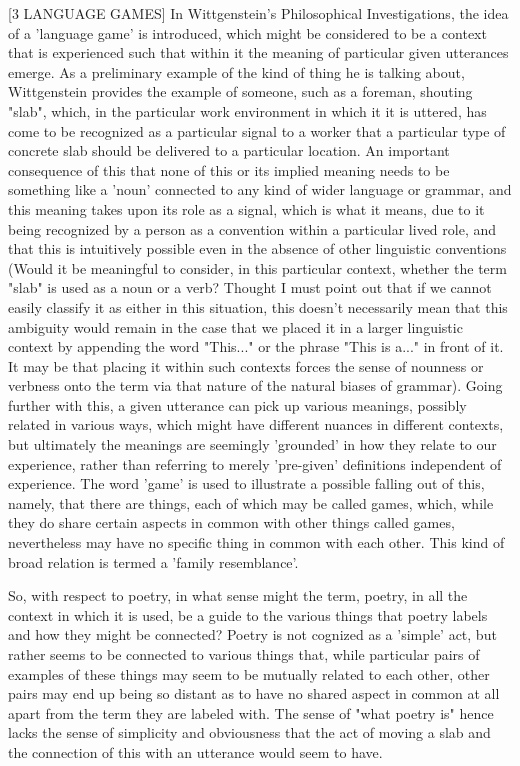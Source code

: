 \documentclass[]{article}
\begin{document}
[3 LANGUAGE GAMES] In Wittgenstein's Philosophical Investigations, the idea of a 'language game' is introduced, which might be considered to be a context that is experienced such that within it the meaning of particular given utterances emerge. As a preliminary example of the kind of thing he is talking about, Wittgenstein provides the example of someone, such as a foreman, shouting "slab", which, in the particular work environment in which it it is uttered, has come to be recognized as a particular signal to a worker that a particular type of concrete slab should be delivered to a particular location. An important consequence of this that none of this or its implied meaning needs to be something like a 'noun' connected to any kind of wider language or grammar, and this meaning takes upon its role as a signal, which is what it means, due to it being recognized by a person as a convention within a particular lived role, and that this is intuitively possible even in the absence of other linguistic conventions (Would it be meaningful to consider, in this particular context, whether the term "slab" is used as a noun or a verb? Thought I must point out that if we cannot easily classify it as either in this situation, this doesn't necessarily mean that this ambiguity would remain in the case that we placed it in a larger linguistic context by appending the word "This..." or the phrase "This is a..." in front of it. It may be that placing it within such contexts forces the sense of nounness or verbness onto the term via that nature of the natural biases of grammar). Going further with this, a given utterance can pick up various meanings, possibly related in various ways, which might have different nuances in different contexts, but ultimately the meanings are seemingly 'grounded' in how they relate to our experience, rather than referring to merely 'pre-given' definitions independent of experience. The word 'game' is used to illustrate a possible falling out of this, namely, that there are things, each of which may be called games, which, while they do share certain aspects in common with other things called games, nevertheless may have no specific thing in common with each other. This kind of broad relation is termed a 'family resemblance'.

So, with respect to poetry, in what sense might the term, poetry, in all the context in which it is used, be a guide to the various things that poetry labels and how they might be connected? Poetry is not cognized as a 'simple' act, but rather seems to be connected to various things that, while particular pairs of examples of these things may seem to be mutually related to each other, other pairs may end up being so distant as to have no shared aspect in common at all apart from the term they are labeled with. The sense of "what poetry is" hence lacks the sense of simplicity and obviousness that the act of moving a slab and the connection of this with an utterance would seem to have.
\end{document}
